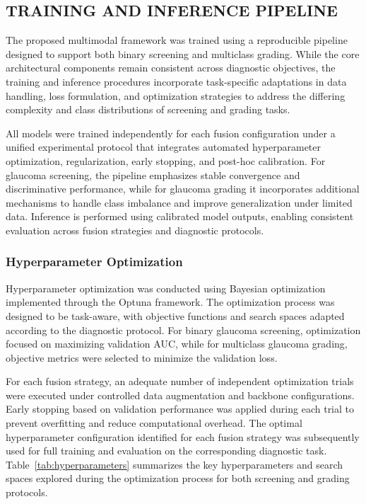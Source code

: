 \documentclass[preprint,12pt]{elsarticle}
\begin{document}
\subsection{TRAINING AND INFERENCE PIPELINE}
\label{subsec:training_inference}

The proposed multimodal framework was trained using a reproducible pipeline designed to support both binary screening and multiclass grading. While the core architectural components remain consistent across diagnostic objectives, the training and inference procedures incorporate task-specific adaptations in data handling, loss formulation, and optimization strategies to address the differing complexity and class distributions of screening and grading tasks.

All models were trained independently for each fusion configuration under a unified experimental protocol that integrates automated hyperparameter optimization, regularization, early stopping, and post-hoc calibration. For glaucoma screening, the pipeline emphasizes stable convergence and discriminative performance, while for glaucoma grading it incorporates additional mechanisms to handle class imbalance and improve generalization under limited data. Inference is performed using calibrated model outputs, enabling consistent evaluation across fusion strategies and diagnostic protocols.


\subsubsection{Hyperparameter Optimization}
\label{subsubsec:hyperopt}

Hyperparameter optimization was conducted using Bayesian optimization implemented through the Optuna framework. The optimization process was designed to be task-aware, with objective functions and search spaces adapted according to the diagnostic protocol. For binary glaucoma screening, optimization focused on maximizing validation AUC, while for multiclass glaucoma grading, objective metrics were selected to minimize the validation loss.

For each fusion strategy, an adequate number of independent optimization trials were executed under controlled data augmentation and backbone configurations. Early stopping based on validation performance was applied during each trial to prevent overfitting and reduce computational overhead. The optimal hyperparameter configuration identified for each fusion strategy was subsequently used for full training and evaluation on the corresponding diagnostic task. Table~\ref{tab:hyperparameters} summarizes the key hyperparameters and search spaces explored during the optimization process for both screening and grading protocols.
\end{document}
